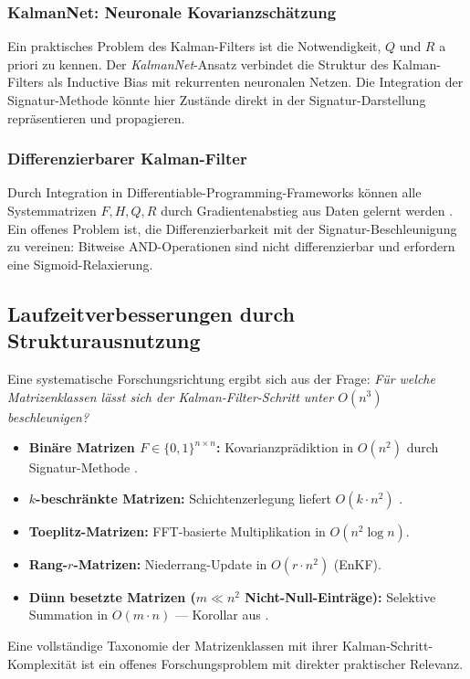 ﻿\documentclass[a4paper,12pt]{article}
\theoremstyle{definition}
\begin{document}
\subsubsection{KalmanNet: Neuronale Kovarianzschätzung}

Ein praktisches Problem des Kalman-Filters ist die Notwendigkeit, $Q$ und $R$
a priori zu kennen. Der \emph{KalmanNet}-Ansatz \cite{revach2022} verbindet die
Struktur des Kalman-Filters als Inductive Bias mit rekurrenten neuronalen Netzen.
Die Integration der Signatur-Methode könnte hier Zustände direkt in der
Signatur-Darstellung repräsentieren und propagieren.

\subsubsection{Differenzierbarer Kalman-Filter}

Durch Integration in Differentiable-Programming-Frameworks können alle Systemmatrizen
$F, H, Q, R$ durch Gradientenabstieg aus Daten gelernt werden \cite{haarnoja2016}.
Ein offenes Problem ist, die Differenzierbarkeit mit der Signatur-Beschleunigung
zu vereinen: Bitweise AND-Operationen sind nicht differenzierbar und erfordern
eine Sigmoid-Relaxierung.

\subsection{Laufzeitverbesserungen durch Strukturausnutzung}

Eine systematische Forschungsrichtung ergibt sich aus der Frage: \emph{Für welche
Matrizenklassen lässt sich der Kalman-Filter-Schritt unter $O(n^3)$ beschleunigen?}
\begin{itemize}
    \item \textbf{Binäre Matrizen $F \in \{0,1\}^{n\times n}$:} Kovarianzprädiktion
          in $O(n^2)$ durch Signatur-Methode \cite{epp2026boolmm}.
    \item \textbf{$k$-beschränkte Matrizen:} Schichtenzerlegung liefert $O(k\cdot n^2)$
          \cite{epp2026boolmm}.
    \item \textbf{Toeplitz-Matrizen:} FFT-basierte Multiplikation in $O(n^2 \log n)$.
    \item \textbf{Rang-$r$-Matrizen:} Niederrang-Update in $O(r \cdot n^2)$ (EnKF).
    \item \textbf{Dünn besetzte Matrizen ($m \ll n^2$ Nicht-Null-Einträge):}
          Selektive Summation in $O(m \cdot n)$ --- Korollar aus \cite{epp2026boolmm}.
\end{itemize}
Eine vollständige Taxonomie der Matrizenklassen mit ihrer Kalman-Schritt-Komplexität
ist ein offenes Forschungsproblem mit direkter praktischer Relevanz.
\end{document}
